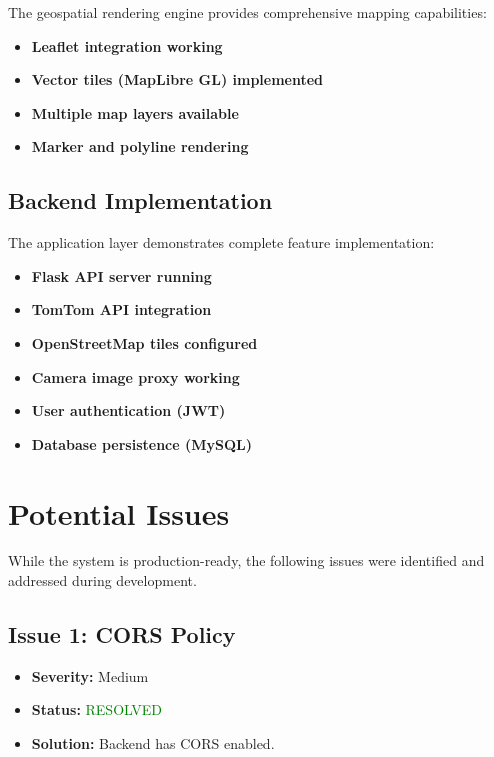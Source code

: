 The geospatial rendering engine provides comprehensive mapping capabilities:

\begin{itemize}
    \item \textbf{Leaflet integration working}
    \item \textbf{Vector tiles (MapLibre GL) implemented} 
    \item \textbf{Multiple map layers available} 
    \item \textbf{Marker and polyline rendering} 
\end{itemize}

\subsection{Backend Implementation}

The application layer demonstrates complete feature implementation:

\begin{itemize}
    \item \textbf{Flask API server running} 
    \item \textbf{TomTom API integration}
    \item \textbf{OpenStreetMap tiles configured} 
    \item \textbf{Camera image proxy working} 
    \item \textbf{User authentication (JWT)} 
    \item \textbf{Database persistence (MySQL)} 
\end{itemize}

\section{Potential Issues}

While the system is production-ready, the following issues were identified and addressed during development.

\subsection{Issue 1: CORS Policy}

\begin{itemize}
    \item \textbf{Severity:} Medium
    \item \textbf{Status:} \textcolor{green}{RESOLVED}
    \item \textbf{Solution:} Backend has CORS enabled.
\end{itemize}

